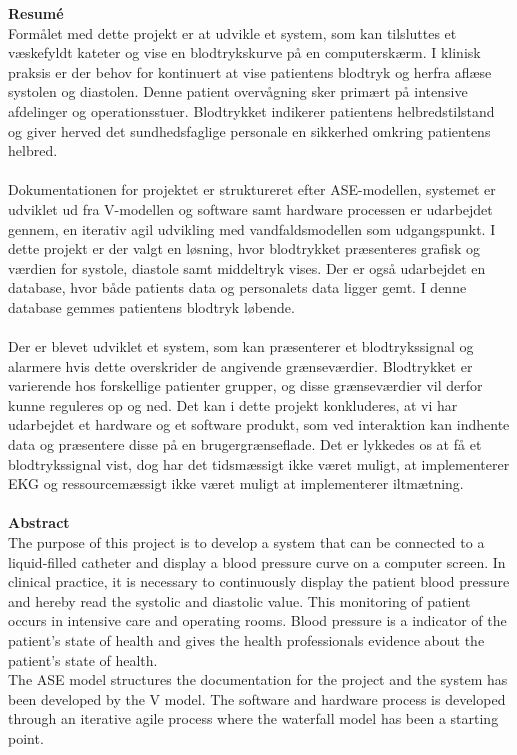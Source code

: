 \textbf{Resumé}\\
Formålet med dette projekt er at udvikle et system, som kan tilsluttes et væskefyldt kateter og vise en blodtrykskurve på en computerskærm. I klinisk praksis er der behov for kontinuert at vise patientens blodtryk og herfra aflæse systolen og diastolen. Denne patient overvågning sker primært på intensive afdelinger og operationsstuer. Blodtrykket indikerer patientens helbredstilstand og giver herved det sundhedsfaglige personale en sikkerhed omkring patientens helbred.\\\\ Dokumentationen for projektet er struktureret efter ASE-modellen, systemet er udviklet ud fra V-modellen og software samt hardware processen er udarbejdet gennem, en iterativ agil udvikling med vandfaldsmodellen som udgangspunkt. I dette projekt er der valgt en løsning, hvor blodtrykket præsenteres grafisk og værdien for systole, diastole samt middeltryk vises. Der er også udarbejdet en database, hvor både patients data og personalets data ligger gemt. I denne database gemmes patientens blodtryk løbende.
\\\\
Der er blevet udviklet et system, som kan præsenterer et blodtrykssignal og alarmere hvis dette overskrider de angivende grænseværdier. Blodtrykket er varierende hos forskellige patienter grupper, og disse grænseværdier vil derfor kunne reguleres op og ned. Det kan i dette projekt konkluderes, at vi har udarbejdet et hardware og et software produkt, som ved interaktion kan indhente data og præsentere disse på en brugergrænseflade. Det er lykkedes os at få et blodtrykssignal vist, dog har det tidsmæssigt ikke været muligt, at implementerer EKG og ressourcemæssigt ikke været muligt at implementerer iltmætning. \\\\
\textbf{Abstract}\\
The purpose of this project is to develop a system that can be connected to a liquid-filled catheter and display a blood pressure curve on a computer screen. In clinical practice, it is necessary to continuously display the patient blood pressure and hereby read the systolic and diastolic value. This monitoring of patient occurs in intensive care and operating rooms. Blood pressure is a indicator of the patient’s state of health and gives the health professionals evidence about the patient’s state of health. \\
The ASE model structures the documentation for the project and the system has been developed by the V model. The software and hardware process is developed through an iterative agile process where the waterfall model has been a starting point.\\\\
